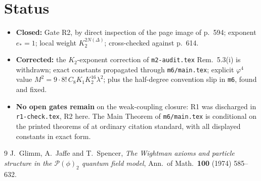 \documentclass[11pt,a4paper]{article}
\theoremstyle{plain}
\theoremstyle{definition}
\begin{document}
\section{Status}

\begin{itemize}
\item \textbf{Closed:} Gate R2, by direct inspection of the page image of p.~594; exponent
      $e_*=1$; local weight $K_2^{2N(\Delta)}$; cross-checked against p.~614.
\item \textbf{Corrected:} the $K_2$-exponent correction of \texttt{m2-audit.tex} Rem.~5.3(i) is
      withdrawn; exact constants propagated through \texttt{m6/main.tex}; explicit $\varphi^4$
      value $M^2=9\cdot8!\,C_8K_1K_2^{16}\lambda^2$; plus the half-degree convention slip in
\texttt{m6}, found and fixed.
\item \textbf{No open gates remain} on the weak-coupling closure: R1 was discharged in
      \texttt{r1-check.tex}, R2 here. The Main Theorem of \texttt{m6/main.tex} is conditional on
      the printed theorems of \cite{GJS} at ordinary citation standard, with all displayed
      constants in exact form.
\end{itemize}

\begin{thebibliography}{9}
 J.~Glimm, A.~Jaffe and T.~Spencer, \emph{The Wightman axioms and particle
structure in the $\mathscr P(\phi)_2$ quantum field model}, Ann.\ of Math.\ \textbf{100} (1974)
585--632.
\end{thebibliography}
\end{document}
